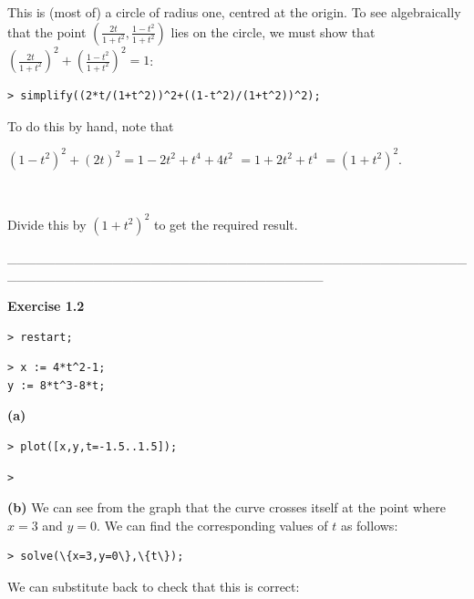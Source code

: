 \documentclass{article}
\begin{document}
\begin{Maple Normal}
This is (most of) a circle of radius one, centred at the origin.  To see algebraically that the point 
$ (\frac{2 t}{1+t^{2}},\frac{1-t^{2}}{1+t^{2}}) $ lies on the circle, we must show that 
$ (\frac{2 t}{1+t^{2}})^{2}+(\frac{1-t^{2}}{1+t^{2}})^{2}=1 $:
\end{Maple Normal}
\begin{lstlisting}
> simplify((2*t/(1+t^2))^2+((1-t^2)/(1+t^2))^2);
\end{lstlisting}
\begin{Maple Normal}
To do this by hand, note that
\end{Maple Normal}
\begin{center}

$ (1-t^{2})^{2}+(2 t)^{2}=1-2 t^{2}+t^{4}+4 t^{2} $
$ =1+2 t^{2}+t^{4} $
$ =(1+t^{2})^{2} $.\end{center}
\begin{Maple Normal}
\

Divide this by 
$ (1+t^{2})^{2} $ to get the required result.
\end{Maple Normal}
\begin{Maple Normal}
\_\_\_\_\_\_\_\_\_\_\_\_\_\_\_\_\_\_\_\_\_\_\_\_\_\_\_\_\_\_\_\_\_\_\_\_\_\_\_\_\_\_\_\_\_\_\_\_\_\_\_\_\_\_\_\_\_\_\_\_\_\_\_\_\_\_\_\_\_\_\_\_\_\_\_\_\_\_\_\_\_
\end{Maple Normal}
\begin{Maple Normal}
\textbf{Exercise 1.2}
\end{Maple Normal}
\begin{lstlisting}
> restart;
\end{lstlisting}
\begin{lstlisting}
> x := 4*t^2-1;
y := 8*t^3-8*t;
\end{lstlisting}
\begin{Maple Normal}
\textbf{(a)}
\end{Maple Normal}
\begin{lstlisting}
> plot([x,y,t=-1.5..1.5]);
\end{lstlisting}
\begin{lstlisting}
> 
\end{lstlisting}
\textbf{(b) }We can see from the graph that the curve crosses itself at the point where 
$ x =3 $ and 
$ y =0 $.  We can find the corresponding values of 
$ t  $ as follows:\begin{lstlisting}
> solve(\{x=3,y=0\},\{t\});
\end{lstlisting}
\begin{Maple Normal}
We can substitute back to check that this is correct:
\end{Maple Normal}
\end{document}
